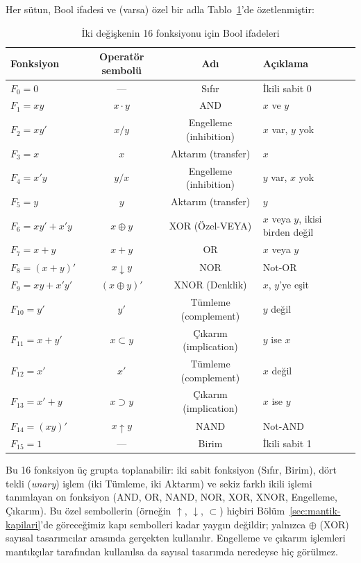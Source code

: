 Her sütun, Bool ifadesi ve (varsa) özel bir adla Tablo~\ref{tab:16-fonksiyon-ifade}'de
özetlenmiştir:

\begin{table}[H]
\centering
\small
\begin{tabular}{lccl}
\toprule
Fonksiyon & Operatör sembolü & Adı & Açıklama \\
\midrule
$F_0=0$ & --- & Sıfır & İkili sabit 0 \\
$F_1=xy$ & $x\cdot y$ & AND & $x$ ve $y$ \\
$F_2=xy'$ & $x/y$ & Engelleme (inhibition) & $x$ var, $y$ yok \\
$F_3=x$ & $x$ & Aktarım (transfer) & $x$ \\
$F_4=x'y$ & $y/x$ & Engelleme (inhibition) & $y$ var, $x$ yok \\
$F_5=y$ & $y$ & Aktarım (transfer) & $y$ \\
$F_6=xy'+x'y$ & $x\oplus y$ & XOR (Özel-VEYA) & $x$ veya $y$, ikisi birden değil \\
$F_7=x+y$ & $x+y$ & OR & $x$ veya $y$ \\
$F_8=(x+y)'$ & $x\downarrow y$ & NOR & Not-OR \\
$F_9=xy+x'y'$ & $(x\oplus y)'$ & XNOR (Denklik) & $x$, $y$'ye eşit \\
$F_{10}=y'$ & $y'$ & Tümleme (complement) & $y$ değil \\
$F_{11}=x+y'$ & $x\subset y$ & Çıkarım (implication) & $y$ ise $x$ \\
$F_{12}=x'$ & $x'$ & Tümleme (complement) & $x$ değil \\
$F_{13}=x'+y$ & $x\supset y$ & Çıkarım (implication) & $x$ ise $y$ \\
$F_{14}=(xy)'$ & $x\uparrow y$ & NAND & Not-AND \\
$F_{15}=1$ & --- & Birim & İkili sabit 1 \\
\bottomrule
\end{tabular}
\caption{İki değişkenin 16 fonksiyonu için Bool ifadeleri}
\label{tab:16-fonksiyon-ifade}
\end{table}

Bu 16 fonksiyon üç grupta toplanabilir: iki sabit fonksiyon (Sıfır, Birim), dört tekli
(\emph{unary}) işlem (iki Tümleme, iki Aktarım) ve sekiz farklı ikili işlemi tanımlayan on
fonksiyon (AND, OR, NAND, NOR, XOR, XNOR, Engelleme, Çıkarım). Bu özel sembollerin
(örneğin $\uparrow$, $\downarrow$, $\subset$) hiçbiri Bölüm~\ref{sec:mantik-kapilari}'de
göreceğimiz kapı sembolleri kadar yaygın değildir; yalnızca $\oplus$ (XOR) sayısal
tasarımcılar arasında gerçekten kullanılır. Engelleme ve çıkarım işlemleri mantıkçılar
tarafından kullanılsa da sayısal tasarımda neredeyse hiç görülmez.

